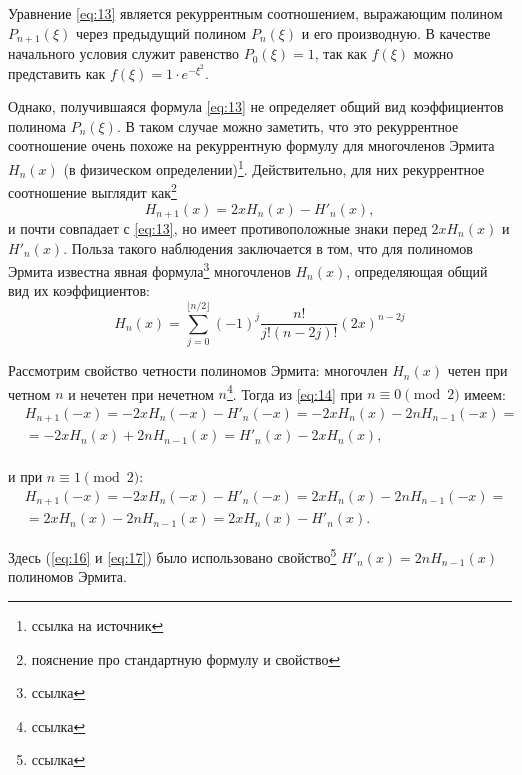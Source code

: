 Уравнение \eqref{eq:13} является рекуррентным соотношением, выражающим полином $P_{n+1}(\xi)$ через предыдущий полином $P_{n}(\xi)$ и его производную. В качестве начального условия служит равенство $P_0(\xi)=1$, так как $f(\xi)$ можно представить как $f(\xi)=1\cdot e^{-\xi^2}$.

Однако, получившаяся формула \eqref{eq:13} не определяет общий вид коэффициентов полинома $P_n(\xi)$. В таком случае можно заметить, что это рекуррентное соотношение очень похоже на рекуррентную формулу для многочленов Эрмита $H_n(x)$ (в физическом определении)\footnote{ссылка на источник}. Действительно, для них рекуррентное соотношение выглядит как\footnote{пояснение про стандартную формулу и свойство}
\begin{equation}
    H_{n+1}(x)=2x H_n(x)-H'_n(x),
    \label{eq:14}
\end{equation}
и почти совпадает с \eqref{eq:13}, но имеет противоположные знаки перед $2xH_n(x)$ и $H'_n(x)$. Польза такого наблюдения заключается в том, что для полиномов Эрмита известна явная формула\footnote{ссылка} многочленов $H_n(x)$, определяющая общий вид их коэффициентов:
\begin{equation}
    H_n(x) = \sum_{j=0}^{\lfloor n/2 \rfloor} (-1)^j \frac{n!}{j! (n-2j)!} (2x)^{n-2j}
\label{eq:15}
\end{equation}

Рассмотрим свойство четности полиномов Эрмита: многочлен $H_n(x)$ четен при четном $n$ и нечетен при нечетном $n$\footnote{ссылка}. Тогда из \eqref{eq:14} при $n \equiv 0 \pmod{2}$ имеем:
\begin{equation}
\label{eq:16}
\begin{aligned}
    & H_{n+1}(-x)=-2x H_n(-x)-H'_n(-x)=-2xH_n(x)-2nH_{n-1}(-x)=\\
    & =-2xH_n(x)+2nH_{n-1}(x)=H'_n(x)-2xH_n(x),
\end{aligned}
\end{equation}
\hfill\\
и при $n \equiv 1 \pmod{2}$:\\
\begin{equation}
\label{eq:17}
\begin{aligned}
    & H_{n+1}(-x)=-2x H_n(-x)-H'_n(-x)=2xH_n(x)-2nH_{n-1}(-x)=\\
    & =2xH_n(x)-2nH_{n-1}(x)=2xH_n(x)-H'_n(x).
\end{aligned}
\end{equation}

Здесь (\eqref{eq:16} и \eqref{eq:17}) было использовано свойство\footnote{ссылка} $H'_n(x)=2nH_{n-1}(x)$ полиномов Эрмита.

